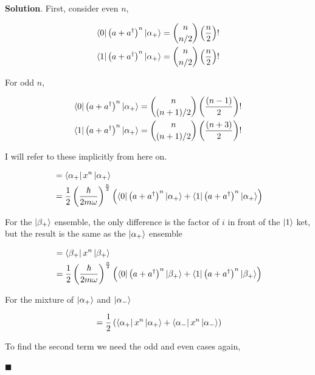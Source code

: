 \documentclass[12pt]{article}
\theoremstyle{definition}
\newenvironment{s}{%
        \begin{trivlist} \item \textbf{Solution}. }{%
            \hspace*{\fill} $\blacksquare$\end{trivlist}}%
\begin{document}
{\begin{s}
First, consider even $n$, 

\begin{align*}
\bra{0}\left(a+a^{\dagger}\right)^{n}\ket{\alpha_{+}} = {n\choose n/2}\left(\frac{n}{2}\right)!\\
\bra{1}\left(a+a^{\dagger}\right)^{n}\ket{\alpha_{+}} = {n\choose n/2}\left(\frac{n}{2}\right)!
\end{align*}

For odd $n$, 

\begin{align*}
\bra{0}\left(a+a^{\dagger}\right)^{n}\ket{\alpha_{+}} = {n\choose (n+1)/2}\left(\frac{(n-1)}{2}\right)!\\
\bra{1}\left(a+a^{\dagger}\right)^{n}\ket{\alpha_{+}} = {n\choose (n+1)/2}\left(\frac{(n+3)}{2}\right)!
\end{align*}

I will refer to these implicitly from here on.

\begin{align*}
[x^{n}] &= \bra{\alpha_{+}}x^{n}\ket{\alpha_{+}}\\
&= \frac{1}{2}\left(\frac{\hbar}{2m\omega}\right)^{\frac{n}{2}}\left(\bra{0}\left(a+a^{\dagger}\right)^{n}\ket{\alpha_{+}} + \bra{1}\left(a+a^{\dagger}\right)^{n}\ket{\alpha_{+}}\right)\\
\end{align*}

For the $\ket{\beta_+}$ ensemble, the only difference is the factor of $i$ in front of the $\ket{1}$ ket, but the result is the same as the $\ket{\alpha_{+}}$ ensemble

\begin{align*}
[x^{n}] &= \bra{\beta_{+}}x^{n}\ket{\beta_{+}}\\
&= \frac{1}{2}\left(\frac{\hbar}{2m\omega}\right)^{\frac{n}{2}}\left(\bra{0}\left(a+a^{\dagger}\right)^{n}\ket{\beta_{+}} + \bra{1}\left(a+a^{\dagger}\right)^{n}\ket{\beta_{+}}\right)\\
\end{align*}

For the mixture of $\ket{\alpha_+}$ and $\ket{\alpha_-}$

\begin{align*}
[x^{n}] &= \frac{1}{2}\left(\bra{\alpha_{+}}x^{n}\ket{\alpha_{+}}+\bra{\alpha_{-}}x^{n}\ket{\alpha_{-}}\right)\\
\end{align*}

To find the second term we need the odd and even cases again,


\end{s}}
\end{document}
